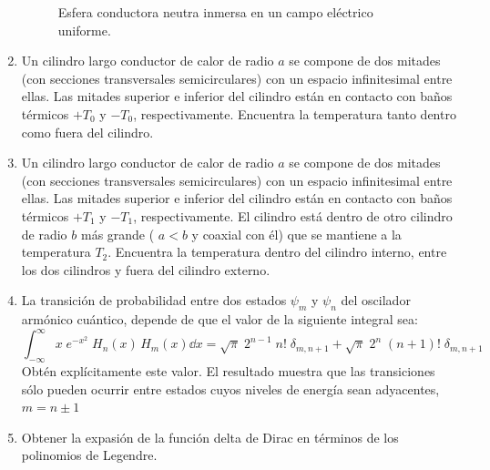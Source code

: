 \begin{enumerate}
\begin{figure}[!ht]
    \caption{Esfera conductora neutra inmersa en un campo eléctrico uniforme.}
    \label{fig:figura3}
\end{figure}
\item Un cilindro largo conductor de calor de radio $a$ se compone de dos mitades (con secciones transversales semicirculares) con un espacio infinitesimal entre ellas. Las mitades superior e inferior del cilindro están en contacto con baños térmicos $+T_{0}$ y $-T_{0}$, respectivamente. Encuentra la temperatura tanto dentro como fuera del cilindro.
\item Un cilindro largo conductor de calor de radio $a$ se compone de dos mitades (con secciones transversales semicirculares) con un espacio infinitesimal entre ellas. Las mitades superior e inferior del cilindro están en contacto con baños térmicos $+T_{1}$ y $-T_{1}$, respectivamente. El cilindro está dentro de otro cilindro de radio $b$ más grande ( $a < b$ y coaxial con él) que se mantiene a la temperatura $T_{2}$. Encuentra la temperatura dentro del cilindro interno, entre los dos cilindros y fuera del cilindro externo.
\item La transición de probabilidad entre dos estados $\psi_{m}$ y $\psi_{n}$ del oscilador armónico cuántico, depende de que el valor de la siguiente integral sea:
\[ \int_{-\infty}^{\infty} x \; e^{-x^{2}} \; H_{n} (x) \, H_{m}(x) \dd x = \sqrt{\pi} \; 2^{n-1} \; n! \; \delta_{m,n+1} + \sqrt{\pi} \; 2^{n} \; (n+1)! \; \delta_{m,n+1} \]
Obtén explícitamente este valor. El resultado muestra que las transiciones sólo pueden ocurrir entre estados cuyos niveles de energía sean adyacentes, $m = n \pm 1$
% 
\item Obtener la expasión de la función delta de Dirac en términos de los polinomios de Legendre.

\end{enumerate}
